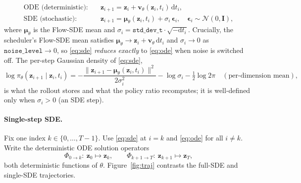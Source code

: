 \documentclass[11pt]{article}
\theoremstyle{plain}
\theoremstyle{remark}
\newcommand{\zt}{\bm{z}}
\newcommand{\eps}{\bm{\epsilon}}
\begin{document}
\begin{align}
\text{ODE (deterministic):}\quad
  &\zt_{i+1}=\zt_i+\bm v_\theta(\zt_i,t_i)\,\mathrm dt_i, \label{eq:ode}\\
\text{SDE (stochastic):}\quad
  &\zt_{i+1}=\bm\mu_\theta(\zt_i,t_i)+\sigma_i\,\eps_i,\quad \eps_i\sim\mathcal N(0,\bm I),
  \label{eq:sde}
\end{align}
where $\bm\mu_\theta$ is the Flow-SDE mean and $\sigma_i=\texttt{std\_dev\_t}\cdot
\sqrt{-\mathrm dt_i}$. Crucially, the scheduler's Flow-SDE mean satisfies
$\bm\mu_\theta\to \zt_i+\bm v_\theta\,\mathrm dt_i$ and $\sigma_i\to0$ as
$\texttt{noise\_level}\to0$, so \eqref{eq:sde} \emph{reduces exactly} to \eqref{eq:ode}
when noise is switched off. The per-step Gaussian density of \eqref{eq:sde},
\begin{equation}
\label{eq:logprob}
\log\pi_\theta(\zt_{i+1}\mid\zt_i,t_i)
  = -\frac{\lVert \zt_{i+1}-\bm\mu_\theta(\zt_i,t_i)\rVert^2}{2\sigma_i^2}
    -\log\sigma_i - \tfrac12\log 2\pi
\quad(\text{per-dimension mean}),
\end{equation}
is what the rollout stores and what the policy ratio recomputes; it is well-defined only
when $\sigma_i>0$ (an SDE step).

\paragraph{Single-step SDE.} Fix one index $k\in\{0,\dots,T-1\}$. Use \eqref{eq:sde} at
$i=k$ and \eqref{eq:ode} for all $i\neq k$. Write the deterministic ODE solution
operators
\begin{equation}
\Phi_{0\to k}:\ \zt_0\mapsto\zt_k,
\qquad
\Phi_{k+1\to T}:\ \zt_{k+1}\mapsto\zt_T,
\end{equation}
both deterministic functions of $\theta$. Figure~\ref{fig:traj} contrasts the full-SDE
and single-SDE trajectories.
\end{document}
